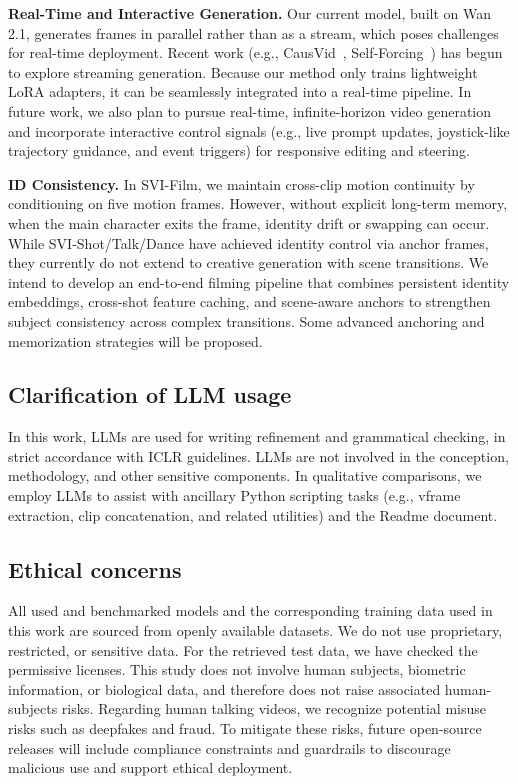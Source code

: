 \documentclass{article} %
\begin{document}
\textbf{Real-Time and Interactive Generation.} Our current model, built on Wan 2.1, generates frames in parallel rather than as a stream, which poses challenges for real-time deployment. Recent work (e.g., CausVid~\citep{yin2025causvid}, Self-Forcing~\citep{huang2025self}) has begun to explore streaming generation. Because our method only trains lightweight LoRA adapters, it can be seamlessly integrated into a real-time pipeline. In future work, we also plan to pursue real-time, infinite-horizon video generation and incorporate interactive control signals (e.g., live prompt updates, joystick-like trajectory guidance, and event triggers) for responsive editing and steering.

\textbf{ID Consistency.} In SVI-Film, we maintain cross-clip motion continuity by conditioning on five motion frames. However, without explicit long-term memory, when the main character exits the frame, identity drift or swapping can occur. While SVI-Shot/Talk/Dance have achieved identity control via anchor frames, they currently do not extend to creative generation with scene transitions. We intend to develop an end-to-end filming pipeline that combines persistent identity embeddings, cross-shot feature caching, and scene-aware anchors to strengthen subject consistency across complex transitions. Some advanced anchoring and memorization strategies will be proposed.

\subsection{Clarification of LLM usage}

In this work, LLMs are used for writing refinement and grammatical checking, in strict accordance with ICLR guidelines. LLMs are not involved in the conception, methodology, and other sensitive components. In qualitative comparisons, we employ LLMs to assist with ancillary Python scripting tasks (e.g., vframe extraction, clip concatenation, and related utilities) and the Readme document.


\subsection{Ethical concerns}

All used and benchmarked models and the corresponding training data used in this work are sourced from openly available datasets. We do not use proprietary, restricted, or sensitive data. For the retrieved test data, we have checked the permissive licenses. This study does not involve human subjects, biometric information, or biological data, and therefore does not raise associated human-subjects risks. Regarding human talking videos, we recognize potential misuse risks such as deepfakes and fraud. To mitigate these risks, future open-source releases will include compliance constraints and guardrails to discourage malicious use and support ethical deployment.
\end{document}
